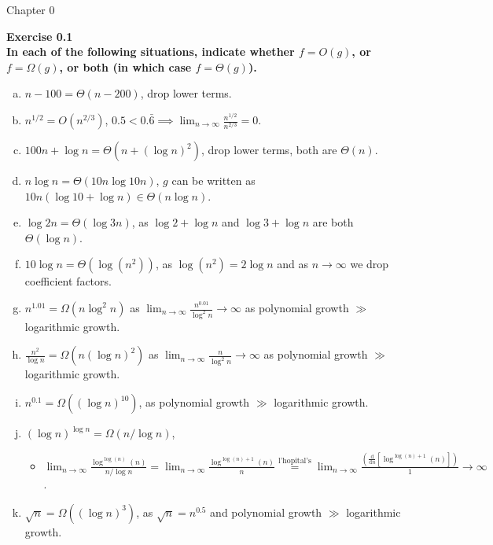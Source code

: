 \documentclass{article}
\newenvironment{problem}[2][Exercise]
    { \begin{mdframed}[backgroundcolor=gray!20] \textbf{#1 #2} \\}
    {  \end{mdframed}}
\begin{document}
\begin{mdframed}[backgroundcolor=blue!20]
Chapter 0
\end{mdframed}

\begin{problem}{0.1}
    \textbf{In each of the following situations, indicate whether $f = O(g)$, or $f =\Omega(g)$, or both (in which case $f = \Theta(g)$).}
    
    \begin{enumerate}[(a)]
        \item $n-100=\Theta(n-200)$, drop lower terms.
        \item $n^{1/2}= O(n^{2/3})$, $0.5 < 0.\bar 6\implies\displaystyle\lim_{n\to\infty}\frac{n^{1/2}}{n^{2/3}}=0$.
        \item $100n+\log{n}=\Theta(n+(\log{n})^2)$, drop lower terms, both are $\Theta(n)$.
        \item $n\log n=\Theta(10n\log 10n)$, $g$ can be written as $10n(\log10+\log n)\in\Theta(n\log n)$.
        \item $\log 2n=\Theta(\log 3n)$, as $\log 2+\log n$ and $\log 3+\log n$ are both $\Theta(\log n)$.
        \item $10\log n=\Theta(\log(n^2))$, as $\log(n^2)=2\log n$ and as $n\to\infty$ we drop coefficient factors.
        \item $n^{1.01}=\Omega(n\log^2 n)$ as $\displaystyle\lim_{n\to\infty}\frac{n^{0.01}}{\log^2 n}\to\infty$ as polynomial growth $\gg$ logarithmic growth.
        \item $\frac{n^2}{\log n}=\Omega(n(\log n)^2)$ as $\displaystyle\lim_{n\to\infty}\frac{n}{\log^2 n}\to\infty$ as polynomial growth $\gg$ logarithmic growth.
        \item $n^{0.1}=\Omega((\log n)^{10})$, as polynomial growth $\gg$ logarithmic growth.
        \item $(\log n)^{\log n}=\Omega(n/\log n)$, 
            \begin{itemize}
                \item $\displaystyle\lim_{n\to\infty} \frac{\log^{\log(n)}(n)}{n/\log{n}}
                =\lim_{n\to\infty} \frac{\log^{\log(n)+1}(n)}{n}
                \stackrel{\text{l'hopital's}}{=}\lim_{n\to\infty}\frac{\left(\frac{\mathrm d}{\mathrm{d}n}\left[\log^{\log(n)+1}(n)\right]\right)}{1}
                \to\infty$.
            \end{itemize}
        \item $\sqrt n=\Omega((\log n)^3)$, as $\sqrt n=n^{0.5}$ and polynomial growth $\gg$ logarithmic growth.

\end{enumerate}
\end{problem}
\end{document}
